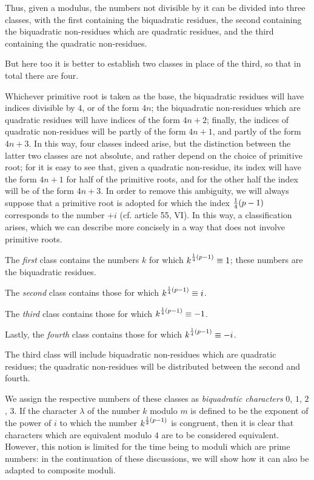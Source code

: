 \documentclass[twoside,12pt]{memoir}
\let\oldfrac\frac
\def\frac#1#2{\mathchoice{\tfrac{#1}{#2}}{\oldfrac{#1}{#2}}{\genfrac{}{}{}{2}{#1}{#2\mathstrut}}{\genfrac{}{}{}{3}{#1}{#2\mathstrut}}}
\begin{document}
Thus, given a modulus, the numbers not divisible by it can be divided into three classes, with the first containing the biquadratic residues, the second containing the biquadratic non-residues which are quadratic residues, and the third containing the quadratic non-residues.\pagebreak%

But here too it is better to establish two classes in place of the third, so that in total there are four.

Whichever primitive root is taken as the base, the biquadratic residues will have indices divisible by \(4\), or of the form \(4n\); the biquadratic non-residues which are quadratic residues will have indices of the form \(4n+2\); finally, the indices of quadratic non-residues will be partly of the form \(4n+1\), and partly of the form \(4n+3\). In this way, four classes indeed arise, but the distinction between the latter two classes are not absolute, and rather depend on the choice of primitive root; for it is easy to see that, given a quadratic non-residue, its index will have the form \(4n+1\) for half of the primitive roots, and for the other half the index will be of the form \(4n+3\). In order to remove this ambiguity, we will always suppose that a primitive root is adopted for which the index \(\frac{1}{4}(p-1)\) corresponds to the number \(+i\) (cf. article 55, VI). In this way, a classification arises, which we can describe more concisely in a way that does not involve primitive roots.

The \textit{first} class contains the numbers \(k\) for which \(k^{\frac{1}{4}(p-1)} \equiv 1\); these numbers are the biquadratic residues.

The \textit{second} class contains those for which \(k^{\frac{1}{4}(p-1)} \equiv i\).

The \textit{third} class contains those for which \(k^{\frac{1}{4}(p-1)} \equiv-1\).

Lastly, the \textit{fourth} class contains those for which \(k^{\frac{1}{4}(p-1)} \equiv-i\).

The third class will include biquadratic non-residues which are quadratic residues; the quadratic non-residues will be distributed between the second and fourth.

We assign the respective numbers of these classes as \textit{biquadratic characters} \(0\), \(1\), \(2\), \(3\). If the character \(\lambda\) of the number \(k\) modulo \(m\) is defined to be the exponent of the power of \(i\) to which the number \(k^{\frac{1}{2}(p-1)}\) is congruent, then it is clear that characters which are equivalent modulo \(4\) are to be considered equivalent. However, this notion is limited for the time being to moduli which are prime numbers: in the continuation of these discussions, we will show how it can also be adapted to composite moduli.
\end{document}
